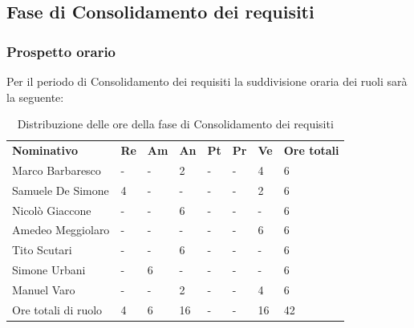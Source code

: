     
\subsection{Fase di Consolidamento dei requisiti}
    \subsubsection{Prospetto orario}
    Per il periodo di Consolidamento dei requisiti la suddivisione oraria dei ruoli sarà la seguente:

        \begin{center}
            \begin{table}[ht!]
                \centering
                \caption{Distribuzione delle ore della fase di Consolidamento dei requisiti}
                \vspace{5px}
                \renewcommand{\arraystretch}{1.8}
                \begin{tabular}{p{100px} p{20px} p{20px} p{20px} p{20px} p{20px} p{20px} p{50px} }
                    \rowcolor{logo!70} \textbf{Nominativo} & \textbf{Re} & \textbf{Am} & \textbf{An} & \textbf{Pt} & \textbf{Pr} & \textbf{Ve} & \textbf{Ore totali}\\
                    Marco Barbaresco & - & - & 2 & - & - & 4 & 6\\
                    Samuele De Simone & 4 & - & - & - & - & 2 & 6\\
                    Nicolò Giaccone & - & - & 6 & - & - & - & 6\\
                    Amedeo Meggiolaro & - & - & - & - & - & 6 & 6\\
                    Tito Scutari & - & - & 6 & - & - & - & 6\\
                    Simone Urbani & - & 6 & - & - & - & - & 6\\
                    Manuel Varo & - & - & 2 & - & - & 4 & 6\\
                    Ore totali di ruolo & 4 & 6 & 16 & - & - & 16 & 42\\
                \end{tabular}
            \end{table}
        \end{center}
        \pagebreak

